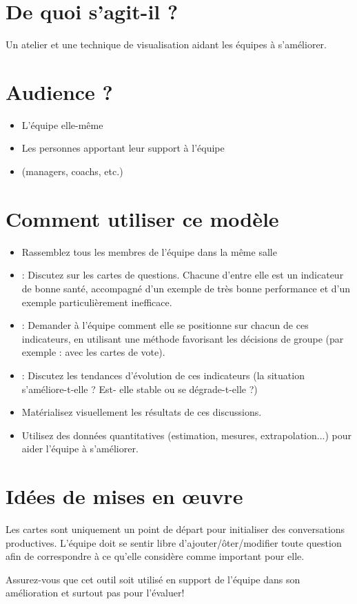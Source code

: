 \documentclass[10pt]{article}
\newcommand*\circled[1]{
  \tikz[baseline=(char.base)]{
    \node[shape=circle,draw,fill=white,inner sep=2pt ] (char) {#1};}}
\begin{document}
\begin{minipage}{0.6\linewidth}
\section*{De quoi s’agit-il ?}
Un atelier et une technique de visualisation aidant les équipes à s’améliorer.

\section*{Audience ?}
\begin{itemize}
  \item L’équipe elle-même
  \item Les personnes apportant leur support à l’équipe
  \item (managers, coachs, etc.)
\end{itemize}


\section*{Comment utiliser ce modèle}
\begin{itemize}
  \item Rassemblez tous les membres de l’équipe dans la même salle
  \item \circled{1} : Discutez sur les cartes de questions. Chacune d’entre elle est un indicateur de bonne santé, accompagné d’un exemple de très bonne performance et d’un exemple particulièrement inefficace.
  \item \circled{2} : Demander à l’équipe comment elle se positionne sur chacun de ces indicateurs, en utilisant une méthode favorisant les décisions de groupe (par exemple : avec les cartes de vote).
  \item \circled{3} : Discutez les tendances d’évolution de ces indicateurs (la situation s’améliore-t-elle ? Est- elle stable ou se dégrade-t-elle ?)
  \item Matérialisez visuellement les résultats de ces discussions.
  \item Utilisez des données quantitatives (estimation, mesures, extrapolation...) pour aider l’équipe à s’améliorer.
\end{itemize}


\section*{Idées de mises en œuvre}
  Les cartes sont uniquement un point de départ pour initialiser des conversations productives. L’équipe doit se sentir libre d’ajouter/ôter/modifier toute question afin de correspondre à ce qu’elle considère comme important pour elle.

  Assurez-vous que cet outil soit utilisé en support de l’équipe dans son amélioration et surtout pas pour l’évaluer!
\end{minipage} \hfill
\end{document}
